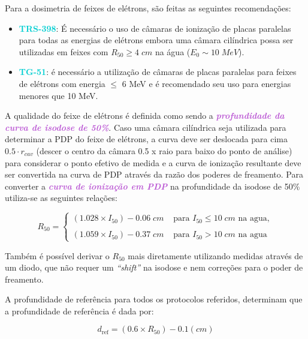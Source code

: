 \documentclass[11pt,a4paper]{article}
\begin{document}
	Para a dosimetria de feixes de elétrons, são feitas as seguintes recomendações:

		\begin{itemize}
			\item \textcolor{DarkTurquoise}{\Large\LobsterTwo\textbf{TRS-398}}: É necessário o uso de câmaras de ionização de placas paralelas para todas as energias de elétrons embora uma câmara cilíndrica possa ser utilizadas em feixes com $R_{50} \geq 4\;cm$ na água ($E_0 \sim 10\; MeV$). 
			\item \textcolor{DarkTurquoise}{\Large\LobsterTwo\textbf{TG-51}}: é necessário a utilização de câmaras de placas paralelas para feixes de elétrons com energia $\leq$ 6 MeV e é recomendado seu uso para energias menores que 10 MeV.
		\end{itemize}

	A qualidade do feixe de elétrons é definida como sendo a \textcolor{MediumOrchid}{\textbf{\textit{profundidade da curva de isodose de 50\%}}}. Caso uma câmara cilíndrica seja utilizada para determinar a PDP do feixe de elétrons, a curva deve ser deslocada para cima $0.5\cdot r_{cav}$ (descer o centro da câmara 0.5 x raio para baixo do ponto de análise) para considerar o ponto efetivo de medida e a curva de ionização resultante deve ser convertida na curva de PDP através da razão dos poderes de freamento. Para converter a \textcolor{MediumOrchid}{\textbf{\textit{curva de ionização em PDP}}} na profundidade da isodose de 50\% utiliza-se as seguintes relações:

		\begin{equation}
			R_{50} = 
			\begin{cases}
				(1.028 \times I_{50}) - 0.06 \;cm  & \text{ para }  I_{50} \leq 10 \; cm \text{ na agua}, \\
				\\
				(1.059 \times I_{50}) - 0.37\;cm  & \text{ para } I_{50} > 10\;cm \text{ na agua}
			\end{cases}
		\end{equation}


	Também é possível derivar o $R_{50}$ mais diretamente utilizando medidas através de um diodo, que não requer um \textit{``shift''} na isodose e nem correções para o poder de freamento. 

	A profundidade de referência para todos os protocolos referidos, determinam que a profundidade de referência é dada por:

		\begin{equation}
			d_{\text{ref}} = (0.6 \times R_{50}) - 0.1 (cm)
		\end{equation}
		
\end{document}
